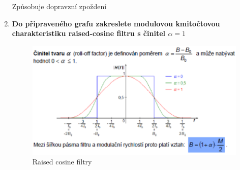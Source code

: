 \begin{enumerate}
    Způsobuje dopravzní zpoždení

    \item \textbf{Do připraveného grafu zakreslete modulovou kmitočtovou charakteristiku raised-cosine filtru s činitel $\alpha=1$}
    \begin{figure}[h!]
        \centering
        \includegraphics[scale=0.3]{images/NyquistFilter.png}
        \caption{Raised cosine filtry}
        \label{fig:enter-label}
    \end{figure}
\end{enumerate}

